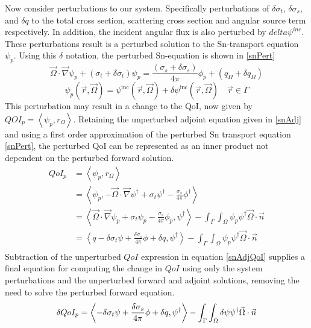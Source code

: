 \documentclass{article}
\newcommand{\vr}{\vec{r}}
\newcommand{\vO}{\vec{\Omega}}
\newcommand{\bra}{\left\langle}
\newcommand{\ket}{\right\rangle}
\newcommand{\vgrad}{\vec{\nabla}}
\newcommand{\sigt}{\sigma_t}
\newcommand{\sigs}{\sigma_s}
\newcommand{\angSource}{q_\Omega}
\newcommand{\scalSource}{q}
\newcommand{\angResp}{r_\Omega}
\begin{document}
Now consider perturbations to our system. Specifically perturbations of $\delta \sigt$, $\delta \sigs$, and $\delta q$ to the total cross section, scattering cross section and angular source term respectively. In addition, the incident angular flux is also perturbed by $delta \psi^{inc}$. These perturbations result is a perturbed solution to the Sn-transport equation $\psi_p$. Using this $\delta$ notation, the perturbed Sn-equation is shown in \ref{snPert}
\begin{equation}
\label{snPert}
\vO \cdot \vgrad \psi_p + \left( \sigt + \delta \sigt \right) \psi_p = \frac{\left( \sigs + \delta \sigs \right)}{4 \pi} \phi_p + \left( \angSource + \delta \angSource \right)
\end{equation}
\begin{equation}
\psi_p(\vr,\vO) = \psi^{\text{inc}}(\vr,\vO) + \delta \psi^{\text{inc}}(\vr,\vO)\quad \vr \in \Gamma
\end{equation}
This perturbation may result in a change to the QoI, now given by $QOI_p=\bra \psi_p , \angResp \ket$. Retaining the unperturbed adjoint equation given in \ref{snAdj} and using a first order approximation of the perturbed Sn transport equation \ref{snPert}, the perturbed QoI can be represented as an inner product not dependent on the perturbed forward solution.
\begin{equation}
\label{snSens}
\begin{split}
QoI_p &=\bra \psi_p , \angResp \ket \\
&=\bra \psi_p , - \vO \cdot \vgrad \psi^\dag + \sigt \psi^\dag - \frac{\sigs}{4 \pi} \phi^\dag  \ket \\
&= \bra  \vO \cdot \vgrad \psi_p + \sigt \psi_p - \frac{\sigs}{4 \pi} \phi_p , \psi^\dag  \ket - \int_{\Gamma} \int_{\Omega} \psi_p \psi^\dag \vO \cdot \vec{n}\\
&= \bra  \scalSource - \delta \sigt \psi + \frac{\delta\sigs}{4 \pi} \phi + \delta \scalSource , \psi^\dag  \ket - \int_{\Gamma} \int_{\Omega} \psi_p \psi^\dag \vO \cdot \vec{n}\\
\end{split}
\end{equation}
Subtraction of the unperturbed $QoI$ expression in equation \ref{snAdjQoI} supplies a final equation for computing the change in $QoI$ using only the system perturbations and the unperturbed forward and adjoint solutions, removing the need to solve the perturbed forward equation.
\begin{equation}
\delta QoI_p = \bra - \delta \sigt \psi + \frac{\delta\sigs}{4 \pi} \phi + \delta \scalSource , \psi^\dag  \ket - \int_{\Gamma} \int_{\Omega} \delta \psi \psi^\dag \vO \cdot \vec{n}\\
\end{equation}
\end{document}
